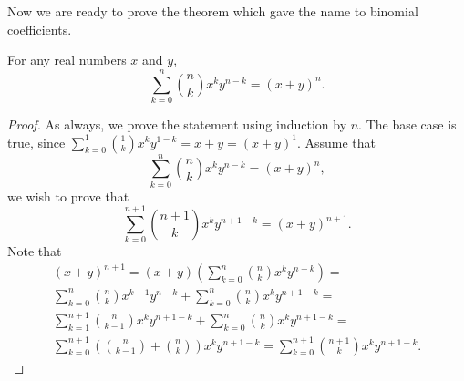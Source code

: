 Now we are ready to prove the theorem which gave the name to binomial
coefficients.
\begin{theorem}
  For any real numbers $x$ and $y$,
    \[
      \sum_{k = 0}^n \binom{n}{k} x^k y^{n - k} = (x + y)^n.
    \]
\end{theorem}
\begin{proof}
  As always, we prove the statement using induction by $n$. The base case is
  true, since $\sum_{k = 0}^1 \binom{1}{k} x^k y^{1 - k} = x + y =
  (x + y)^1$. Assume that
  \[
    \sum_{k = 0}^n \binom{n}{k} x^k y^{n - k} = (x + y)^n,
  \]
  we wish to prove that
  \[
    \sum_{k = 0}^{n + 1} \binom{n + 1}{k} x^k y^{n + 1 - k} =
      (x + y)^{n + 1}.
  \]
  Note that
  \begin{multline*}
    (x + y)^{n + 1} = (x + y)
      \left(
        \sum_{k = 0}^n \binom{n}{k} x^k y^{n - k}
      \right) = \\
    \sum_{k = 0}^n \binom{n}{k} x^{k + 1} y^{n - k} +
      \sum_{k = 0}^n \binom{n}{k} x^{k} y^{n + 1 - k} = \\
    \sum_{k = 1}^{n + 1} \binom{n}{k - 1} x^k y^{n + 1 - k} +
      \sum_{k = 0}^n \binom{n}{k} x^k y^{n + 1 - k} = \\
    \sum_{k = 0}^{n + 1}
      \left(
        \binom{n}{k - 1} + \binom{n}{k}
      \right)
      x^k y^{n + 1 - k} =
    \sum_{k = 0}^{n + 1} \binom{n + 1}{k} x^k y^{n + 1 - k}.
  \end{multline*}
\end{proof}


